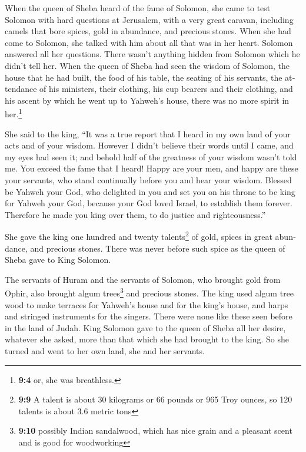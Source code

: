 \begin{paracol}{2}
\begin{otherlanguage}{english}
 When the queen of Sheba heard of the fame of Solomon, she
came to test Solomon with hard questions at Jerusalem, with a very great
caravan, including camels that bore spices, gold in abundance, and
precious stones. When she had come to Solomon, she talked with him about
all that was in her heart.  Solomon answered all her
questions. There wasn't anything hidden from Solomon which he didn't
tell her.  When the queen of Sheba had seen the wisdom of
Solomon, the house that he had built,  the food of his
table, the seating of his servants, the attendance of his ministers,
their clothing, his cup bearers and their clothing, and his ascent by
which he went up to Yahweh's house, there was no more spirit in
her.\footnote{\textbf{9:4} or, she was breathless.}

 She said to the king, ``It was a true report that I heard
in my own land of your acts and of your wisdom.  However I
didn't believe their words until I came, and my eyes had seen it; and
behold half of the greatness of your wisdom wasn't told me. You exceed
the fame that I heard!  Happy are your men, and happy are
these your servants, who stand continually before you and hear your
wisdom.  Blessed be Yahweh your God, who delighted in you
and set you on his throne to be king for Yahweh your God, because your
God loved Israel, to establish them forever. Therefore he made you king
over them, to do justice and righteousness.''

 She gave the king one hundred and twenty
talents\footnote{\textbf{9:9} A talent is about 30 kilograms or 66
  pounds or 965 Troy ounces, so 120 talents is about 3.6 metric tons} of
gold, spices in great abundance, and precious stones. There was never
before such spice as the queen of Sheba gave to King Solomon.

 The servants of Huram and the servants of Solomon, who
brought gold from Ophir, also brought algum trees\footnote{\textbf{9:10}
  possibly Indian sandalwood, which has nice grain and a pleasant scent
  and is good for woodworking} and precious stones.  The
king used algum tree wood to make terraces for Yahweh's house and for
the king's house, and harps and stringed instruments for the singers.
There were none like these seen before in the land of Judah.
 King Solomon gave to the queen of Sheba all her desire,
whatever she asked, more than that which she had brought to the king. So
she turned and went to her own land, she and her servants.


\end{otherlanguage}
\end{paracol}

